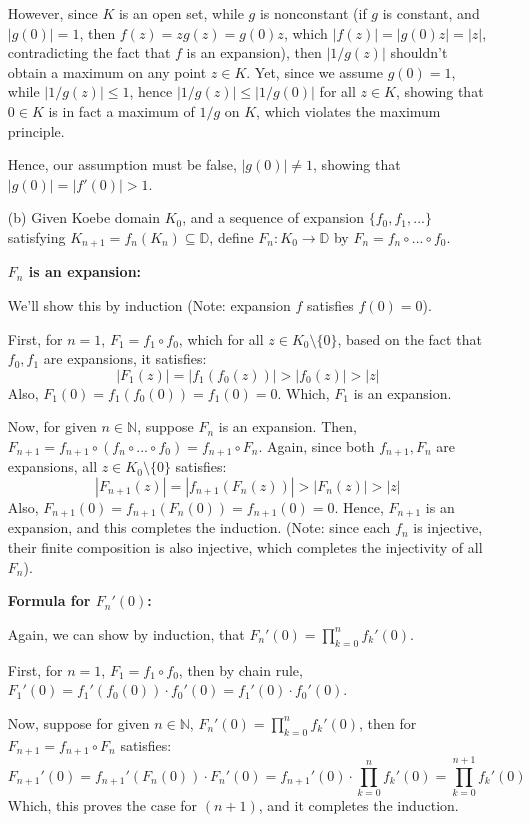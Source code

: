 \documentclass{article}
\begin{document}
\begin{itemize}
    However, since $K$ is an open set, while $g$ is nonconstant (if $g$ is constant, and $|g(0)|=1$, then $f(z)=zg(z)=g(0)z$, which $|f(z)|=|g(0)z|=|z|$, contradicting the fact that $f$ is an expansion), then $|1/g(z)|$ shouldn't obtain a maximum on any point $z\in K$.
    Yet, since we assume $g(0)=1$, while $|1/g(z)|\leq 1$, hence $|1/g(z)|\leq |1/g(0)|$ for all $z\in K$, showing that $0\in K$ is in fact a maximum of $1/g$ on $K$, which violates the maximum principle.

    Hence, our assumption must be false, $|g(0)|\neq 1$, showing that $|g(0)|=|f'(0)|>1$.

    \hfil

    \item[(b)] Given Koebe domain $K_0$, and a sequence of expansion $\{f_0,f_1,...\}$ satisfying $K_{n+1}=f_n(K_n)\subseteq \mathbb{D}$, define $F_n:K_0\rightarrow\mathbb{D}$ by $F_n=f_n\circ...\circ f_0$.

    \textbf{$F_n$ is an expansion:}

    We'll show this by induction (Note: expansion $f$ satisfies $f(0)=0$). 

    First, for $n=1$, $F_1=f_1\circ f_0$, which for all $z\in K_0\setminus\{0\}$, based on the fact that $f_0,f_1$ are expansions, it satisfies:
    $$|F_1(z)| = |f_1(f_0(z))|>|f_0(z)|>|z|$$
    Also, $F_1(0)=f_1(f_0(0))=f_1(0)=0$. Which, $F_1$ is an expansion.

    Now, for given $n\in\mathbb{N}$, suppose $F_n$ is an expansion. Then, $F_{n+1}=f_{n+1}\circ (f_n\circ...\circ f_0)=f_{n+1}\circ F_n$. Again, since both $f_{n+1}, F_n$ are expansions, all $z\in K_0\setminus\{0\}$ satisfies:
    $$|F_{n+1}(z)|=|f_{n+1}(F_n(z))|>|F_n(z)|>|z|$$
    Also, $F_{n+1}(0)=f_{n+1}(F_n(0))=f_{n+1}(0)=0$. Hence, $F_{n+1}$ is an expansion, and this completes the induction. (Note: since each $f_n$ is injective, their finite composition is also injective, which completes the injectivity of all $F_n$).

    \textbf{Formula for $F_n'(0)$:}

    Again, we can show by induction, that $F_n'(0)=\prod_{k=0}^{n}f_k'(0)$.

    First, for $n=1$, $F_1=f_1\circ f_0$, then by chain rule, $F_1'(0)=f_1'(f_0(0))\cdot f_0'(0) = f_1'(0)\cdot f_0'(0)$.

    Now, suppose for given $n\in\mathbb{N}$, $F_n'(0)=\prod_{k=0}^{n}f_k'(0)$, then for $F_{n+1}=f_{n+1}\circ F_n$ satisfies:
    $$F_{n+1}'(0)=f_{n+1}'(F_n(0))\cdot F_n'(0) = f_{n+1}'(0)\cdot \prod_{k=0}^{n}f_k'(0) = \prod_{k=0}^{n+1}f_k'(0)$$
    Which, this proves the case for $(n+1)$, and it completes the induction.


\end{itemize}
\end{document}
